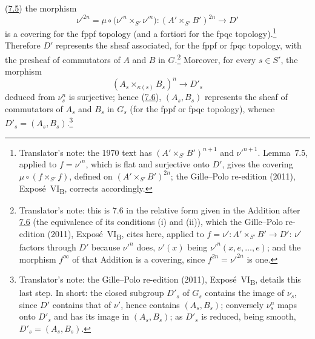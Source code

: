 \textup{(\hyperref[lem:sga3-VIB-7.5]{7.5})} the morphism
\label{form:sga3-VIB-10.12-covering-map}%
\[
  {\nu'}^{2n}
  =\mu\circ\bigl({\nu'}^n\times_{S'}{\nu'}^n\bigr):
  (A'\times_{S'}B')^{2n}\longrightarrow D'
\]
is a covering for the fppf topology \textup{(}and a fortiori for the
fpqc topology\textup{)}.\footnote{Translator's note: the 1970 text has \((A'\times_{S'}B')^{n+1}\) and
\({\nu'}^{n+1}\). Lemma~7.5, applied to \(f={\nu'}^n\), which is flat and surjective onto \(D'\), gives the covering
\(\mu\circ(f\times_{S'}f)\), defined on \((A'\times_{S'}B')^{2n}\); the Gille--Polo re-edition (2011),
Expos\'e~VI\textsubscript{B}, corrects accordingly.} Therefore \(D'\) represents the sheaf associated,
for the fppf or fpqc topology, with the presheaf of commutators of \(A\)
and \(B\) in \(G\).\footnote{Translator's note: this is 7.6 in the relative form given in the Addition
after \hyperref[prop:sga3-VIB-7.6]{7.6} (the equivalence of its conditions (i) and (ii)), which the Gille--Polo
re-edition (2011), Expos\'e~VI\textsubscript{B}, cites here, applied to \(f=\nu'\colon A'\times_{S'}B'\to D'\):
\(\nu'\) factors through \(D'\) because \({\nu'}^n\) does, \(\nu'(x)\) being \({\nu'}^n(x,e,\ldots,e)\); and the
morphism \(f^\infty\) of that Addition is a covering, since \(f^{2n}={\nu'}^{2n}\) is one.} Moreover, for every
\(s\in S'\), the morphism
\[
  (A_s\times_{\kappa(s)}B_s)^n\longrightarrow D'_s
\]
deduced from \(\nu_s^n\) is surjective; hence
\textup{(\hyperref[prop:sga3-VIB-7.6]{7.6})}, \((A_s,B_s)\) represents the
sheaf of commutators of \(A_s\) and \(B_s\) in \(G_s\) \textup{(}for the
fppf or fpqc topology\textup{)}, whence \(D'_s=(A_s,B_s)\).\footnote{Translator's note: the
Gille--Polo re-edition (2011), Expos\'e~VI\textsubscript{B}, details this last step. In short: the closed subgroup
\(D'_s\) of \(G_s\) contains the image of \(\nu_s\), since \(D'\) contains that of \(\nu'\), hence contains
\((A_s,B_s)\); conversely \(\nu_s^n\) maps onto \(D'_s\) and has its image in \((A_s,B_s)\); as \(D'_s\) is reduced,
being smooth, \(D'_s=(A_s,B_s)\).}

